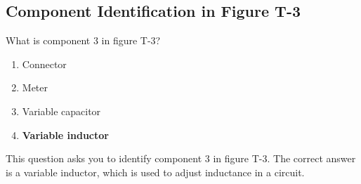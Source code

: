 \subsection{Component Identification in Figure T-3}
\label{T6C10}

\begin{tcolorbox}[colback=gray!10!white,colframe=black!75!black,title=T6C10]
What is component 3 in figure T-3?
\begin{enumerate}[noitemsep]
    \item Connector
    \item Meter
    \item Variable capacitor
    \item \textbf{Variable inductor}
\end{enumerate}
\end{tcolorbox}

This question asks you to identify component 3 in figure T-3. The correct answer is a variable inductor, which is used to adjust inductance in a circuit.